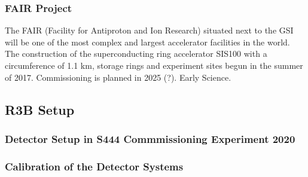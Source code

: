 \subsubsection{FAIR Project}
The FAIR (Facility for Antiproton and Ion Research) situated next to the GSI will be one of the most complex and largest accelerator facilities in the world. The construction of the superconducting ring accelerator SIS100 with a circumference of 1.1 km, storage rings and experiment sites begun in the summer of 2017. Commissioning is planned in 2025 (?). Early Science. 
\subsection{R3B Setup}
\subsubsection{Detector Setup in S444 Commmissioning Experiment 2020}
\subsubsection{Calibration of the Detector Systems}



